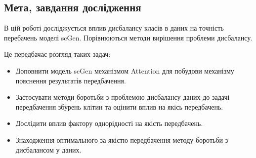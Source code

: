 \subsection{Мета, завдання дослідження}
В цій роботі досліджується вплив дисбалансу класів в даних на точність перебачень моделі scGen. Порівнюються методи вирішення проблеми дисбалансу.


Це передбачає розгляд таких задач:


\begin{itemize}

\item Доповнити модель scGen механізмом Attention для побудови механізму пояснення результатів передбачення.

\item Застосувати методи боротьби з проблемою дисбалансу даних до задачі передбачення збурень клітин та оцінити вплив на якісь передбачень.

\item Дослідити вплив фактору однорідності на якість передбачень.

\item Знаходження оптимального за якістю передбачення методу боротьби з дисбалансом у даних.

\end{itemize}